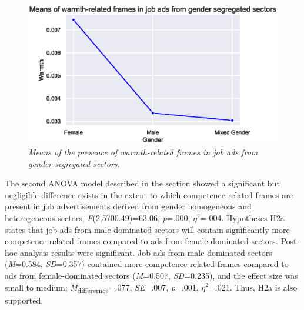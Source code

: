 \documentclass[Royal,sageapa,times]{sagej}
\begin{document}
\begin{figure}[ht]
    \setlength{\fboxsep}{0pt}%
    \setlength{\fboxrule}{0pt}%
    \begin{center}
    \includegraphics[width=\textwidth]{FT/Figure1.eps}
    \end{center}
    \caption{\textit{Means of the presence of warmth-related frames in job ads from gender-segregated sectors.}}
    \label{figure1}
    \end{figure}

The second ANOVA model described in the  section showed a significant but negligible difference exists in the extent to which competence-related frames are present in job advertisements derived from gender homogeneous and heterogeneous sectors; \textit{F}(2,5700.49)=63.06, \textit{p}=.000, \textit{$\eta^2$}=.004. Hypotheses H2a states that job ads from male-dominated sectors will contain significantly more competence-related frames compared to ads from female-dominated sectors. Post-hoc analysis results were significant. Job ads from male-dominated sectors (\textit{M}=0.584, \textit{SD}=0.357) contained more competence-related frames compared to ads from female-dominated sectors (\textit{M}=0.507, \textit{SD}=0.235), and the effect size was small to medium; \textit{M}\textsubscript{differernce}=.077, \textit{SE}=.007, \textit{p}=.001, \textit{$\eta^2$}=.021. Thus, H2a is also supported.
\end{document}
